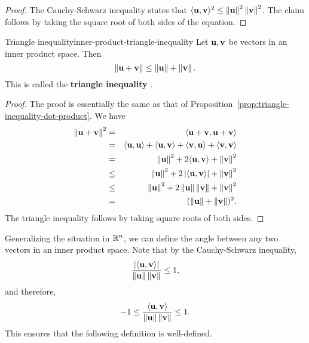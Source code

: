 \begin{proof}
  The Cauchy-Schwarz inequality states that
  $\iprod{\vect{u},\vect{v}}^2 \leq
  \norm{\vect{u}}^2\norm{\vect{v}}^2$. The claim follows by taking the
  square root of both sides of the equation.
\end{proof}

\begin{proposition}{Triangle inequality}{inner-product-triangle-inequality}
  Let $\vect{u},\vect{v}$ be vectors in an inner product space. Then 
  \begin{equation*}
    \norm{\vect{u}+\vect{v}} \leq \norm{\vect{u}} + \norm{\vect{v}}.
  \end{equation*}
  This is called the \textbf{triangle inequality}%
  .
\end{proposition}

\begin{proof}
  The proof is essentially the same as that of
  Proposition~\ref{prop:triangle-inequality-dot-product}. We have
  \begin{eqnarray*}
    \norm{\vect{u}+\vect{v}}^{2}
    &=& \iprod{\vect{u}+\vect{v},\vect{u}+\vect{v}} \\
    &=& \iprod{\vect{u},\vect{u}}+\iprod{\vect{u},\vect{v}}+\iprod{\vect{v},\vect{u}}+\iprod{\vect{v},\vect{v}} \\
    &=&\norm{\vect{u}}^{2}+2\iprod{\vect{u},\vect{v}}+\norm{\vect{v}}^{2} \\
    &\leq& \norm{\vect{u}}^{2}+2\abs{\iprod{\vect{u},\vect{v}}}+\norm{\vect{v}}^{2} \\
    &\leq& \norm{\vect{u}}^{2}+2\norm{\vect{u}}\norm{\vect{v}}+\norm{\vect{v}}^{2} \\
    &=& (\norm{\vect{u}}+\norm{\vect{v}})^{2}.
  \end{eqnarray*}
  The triangle inequality follows by taking square roots of both sides.
\end{proof}

Generalizing the situation in $\mathbb{R}^n$, we can define the angle
between any two vectors in an inner product space. Note that by the
Cauchy-Schwarz inequality,
\begin{equation*}
  \frac{\abs{\iprod{\vect{u},\vect{v}}}}{\norm{\vect{u}}\norm{\vect{v}}}
  \leq 1,
\end{equation*}
and therefore,
\begin{equation*}
  -1 \leq \frac{\iprod{\vect{u},\vect{v}}}{\norm{\vect{u}}\norm{\vect{v}}}
  \leq 1.
\end{equation*}
This ensures that the following definition is well-defined.

